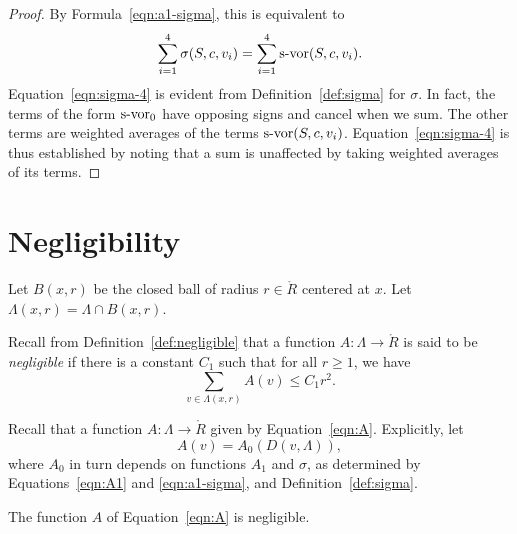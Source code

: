 \begin{proof}
   By Formula~\ref{eqn:a1-sigma}, this is equivalent to
      \begin{equation}
      \sum_{i=1}^4 \sigma(S,c,v_i) = \sum_{i=1}^4
      \operatorname{s-vor}(S,c,v_i).
      \label{eqn:sigma-4}
      \end{equation}
Equation~\ref{eqn:sigma-4} is evident from
Definition~\ref{def:sigma} for $\sigma$.  In fact, the terms of the
form $\operatorname{s-vor}_0$ have opposing signs and cancel when we sum. The other
terms are weighted averages of the terms $\operatorname{s-vor}(S,c,v_i)$.
Equation~\ref{eqn:sigma-4} is thus established by noting that a sum
is unaffected by taking weighted averages of its terms.
\end{proof}


\section{Negligibility} \label{sec:negligible}

Let $B(x,r)$ be the closed ball of radius $r\in\ring{R}$ centered
at $x$.  Let $\Lambda(x,r)=\Lambda\cap B(x,r)$.

Recall from Definition~\ref{def:negligible} that a function
$A:\Lambda\to\ring{R}$ is said to be {\it negligible} if there is
a constant $C_1$ such that for all $r\ge1$, we have
   $$\sum_{v\in\Lambda(x,r) } A(v) \le C_1 r^2.$$
%


Recall that a function $A: \Lambda\to\ring{R}$ given by
Equation~\ref{eqn:A}.  Explicitly, let
   $$A(v) = A_0(D(v,\Lambda)),$$
where $A_0$ in turn depends on functions $A_1$ and $\sigma$, as
determined by Equations~\ref{eqn:A1} and \ref{eqn:a1-sigma}, and
Definition~\ref{def:sigma}.

\begin{theorem}\label{lemma:negligible}
The function $A$ of Equation~\ref{eqn:A} is negligible.
\end{theorem}

